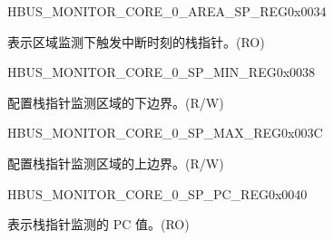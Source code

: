 \begin{register}{H}{BUS\_MONITOR\_CORE\_0\_AREA\_SP\_REG}{0x0034}\label{regdesc:BUSMONITORCORE0AREASPREG}
%
\regnewline%
\begin{regdesc}\begin{reglist}
\label{fielddesc:BUSMONITORCORE0AREASP}\item [BUS\_MONITOR\_CORE\_0\_AREA\_SP] 表示区域监测下触发中断时刻的栈指针。(RO)
\end{reglist}\end{regdesc}
\end{register}


\begin{register}{H}{BUS\_MONITOR\_CORE\_0\_SP\_MIN\_REG}{0x0038}\label{regdesc:BUSMONITORCORE0SPMINREG}
%
\regnewline%
\begin{regdesc}\begin{reglist}
\label{fielddesc:BUSMONITORCORE0SPMIN}\item [BUS\_MONITOR\_CORE\_0\_SP\_MIN] 配置栈指针监测区域的下边界。(R/W)
\end{reglist}\end{regdesc}
\end{register}


\begin{register}{H}{BUS\_MONITOR\_CORE\_0\_SP\_MAX\_REG}{0x003C}\label{regdesc:BUSMONITORCORE0SPMAXREG}
%
\regnewline%
\begin{regdesc}\begin{reglist}
\label{fielddesc:BUSMONITORCORE0SPMAX}\item [BUS\_MONITOR\_CORE\_0\_SP\_MAX] 配置栈指针监测区域的上边界。(R/W)
\end{reglist}\end{regdesc}
\end{register}


\begin{register}{H}{BUS\_MONITOR\_CORE\_0\_SP\_PC\_REG}{0x0040}\label{regdesc:BUSMONITORCORE0SPPCREG}
%
\regnewline%
\begin{regdesc}\begin{reglist}
\label{fielddesc:BUSMONITORCORE0SPPC}\item [BUS\_MONITOR\_CORE\_0\_SP\_PC] 表示栈指针监测的 PC 值。(RO)
\end{reglist}\end{regdesc}
\end{register}



